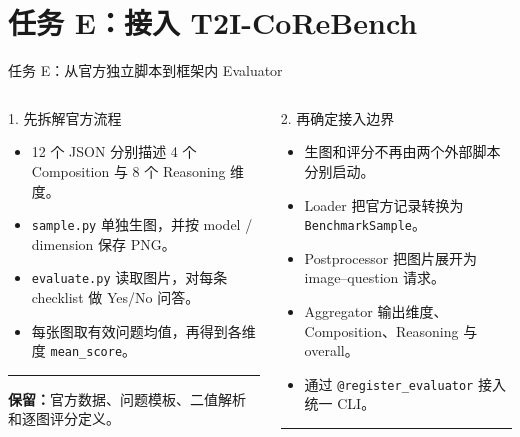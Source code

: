 \documentclass[aspectratio=169,10pt]{beamer}
\begin{document}
\section{任务 E：接入 T2I-CoReBench}
\begin{frame}{任务 E：从官方独立脚本到框架内 Evaluator}
  \begin{columns}[T,onlytextwidth]
      \begin{block}{1. 先拆解官方流程}
        \begin{minipage}[c][4.95cm][c]{\linewidth}
          \begin{itemize}\scriptsize
            \item 12 个 JSON 分别描述 4 个 Composition 与 8 个 Reasoning 维度。
            \item \texttt{sample.py} 单独生图，并按 model / dimension 保存 PNG。
            \item \texttt{evaluate.py} 读取图片，对每条 checklist 做 Yes/No 问答。
            \item 每张图取有效问题均值，再得到各维度 \texttt{mean\_score}。
          \end{itemize}
          \vspace{0.35em}
          \color{T2IGray}\rule{\linewidth}{0.35pt}\par\vspace{0.25em}
          \scriptsize\textbf{保留：}官方数据、问题模板、二值解析和逐图评分定义。
        \end{minipage}
      \end{block}
      \begin{block}{2. 再确定接入边界}
        \begin{minipage}[c][4.95cm][c]{\linewidth}
          \begin{itemize}\scriptsize
            \item 生图和评分不再由两个外部脚本分别启动。
            \item Loader 把官方记录转换为 \texttt{BenchmarkSample}。
            \item Postprocessor 把图片展开为 image--question 请求。
            \item Aggregator 输出维度、Composition、Reasoning 与 overall。
            \item 通过 \texttt{@register\_evaluator} 接入统一 CLI。
          \end{itemize}
          \vspace{0.35em}
          \color{T2IGray}\rule{\linewidth}{0.35pt}\par\vspace{0.25em}

\end{minipage}
\end{block}
\end{columns}
\end{frame}
\end{document}
